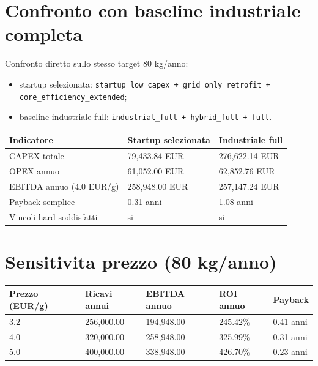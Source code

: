 \documentclass[11pt,a4paper]{article}
\begin{document}
\section*{Confronto con baseline industriale completa}
Confronto diretto sullo stesso target 80 kg/anno:
\begin{itemize}
  \item startup selezionata: \texttt{startup\_low\_capex + grid\_only\_retrofit + core\_efficiency\_extended};
  \item baseline industriale full: \texttt{industrial\_full + hybrid\_full + full}.
\end{itemize}

\begin{longtable}{@{}p{5.8cm}p{3.0cm}p{3.0cm}@{}}
\toprule
Indicatore & Startup selezionata & Industriale full \\ \midrule
CAPEX totale & 79,433.84 EUR & 276,622.14 EUR \\
OPEX annuo & 61,052.00 EUR & 62,852.76 EUR \\
EBITDA annuo (\(4.0\) EUR/g) & 258,948.00 EUR & 257,147.24 EUR \\
Payback semplice & 0.31 anni & 1.08 anni \\
Vincoli hard soddisfatti & si & si \\
\bottomrule
\end{longtable}

\section*{Sensitivita prezzo (80 kg/anno)}
\begin{longtable}{@{}p{3.0cm}p{3.2cm}p{3.2cm}p{2.8cm}p{2.8cm}@{}}
\toprule
Prezzo (EUR/g) & Ricavi annui & EBITDA annuo & ROI annuo & Payback \\ \midrule
3.2 & 256,000.00 & 194,948.00 & 245.42\% & 0.41 anni \\
4.0 & 320,000.00 & 258,948.00 & 325.99\% & 0.31 anni \\
5.0 & 400,000.00 & 338,948.00 & 426.70\% & 0.23 anni \\
\bottomrule
\end{longtable}
\end{document}

